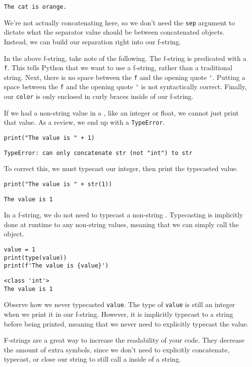 \begin{lstlisting}[style=none]
The cat is orange.
\end{lstlisting}
We're not actually concatenating here, so we don't need the \verb|sep| argument to dictate what the separator value should be between concatenated objects. Instead, we can build our separation right into our f-string.\par
In the above f-string, take note of the following. The f-string is predicated with a \verb|f|. This tells Python that we want to use a f-string, rather than a traditional string. Next, there is no space between the \verb|f| and the opening quote \verb|'|. Putting a space between the \verb|f| and the opening quote \verb|'| is not syntactically correct. Finally, our  \verb|color| is only enclosed in curly braces inside of our f-string.\par
If we had a non-string value in a , like an integer or float, we cannot just print that value. As a review, we end up with a \verb|TypeError|.
\begin{lstlisting}[style=pippython]
print("The value is " + 1)
\end{lstlisting}
\begin{lstlisting}[style=none]
TypeError: can only concatenate str (not "int") to str
\end{lstlisting}
To correct this, we must typecast our integer, then print the typecasted value.
\begin{lstlisting}[style=pippython]
print("The value is " + str(1))
\end{lstlisting}
\begin{lstlisting}[style=none]
The value is 1
\end{lstlisting}
In a f-string, we do not need to typecast a non-string . Typecasting is implicitly done at runtime to any non-string values, meaning that we can simply call the object.\par
\begin{lstlisting}[style=pippython]
value = 1
print(type(value))
print(f'The value is {value}')
\end{lstlisting}
\begin{lstlisting}[style=none]
<class 'int'>
The value is 1
\end{lstlisting}
Observe how we never typecasted \verb|value|. The type of \verb|value| is still an integer when we print it in our f-string. However, it is implicitly typecast to a string before being printed, meaning that we never need to explicitly typecast the value.\par
F-strings are a great way to increase the readability of your code. They decrease the amount of extra symbols, since we don't need to explicitly concatenate, typecast, or close our string to still call a  inside of a string.
